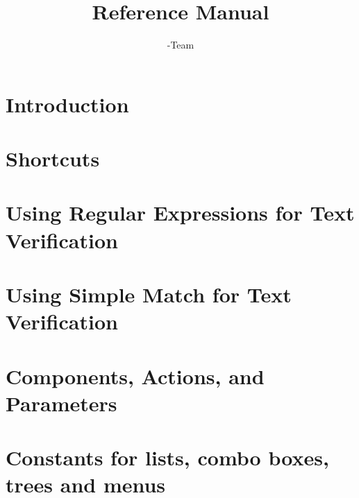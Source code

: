 \documentclass[en,a4paper,twoside,manual,guidancer]{bxreport}
\begin{document}
\title{\GDr{} Reference Manual}
\author*{\GD-Team}{}
\maketitle

\tableofcontents
\renewcommand{\bxcomment}[2]{}%
\clearpage

\chapter{Introduction}

\clearpage

\chapter{Shortcuts}

\clearpage

\chapter{Using Regular Expressions for Text Verification}
\label{regex}

\clearpage

\chapter{Using Simple Match for Text Verification}
\label{simplematch}

\clearpage

\chapter{Components, Actions, and Parameters}
 \label{actparam}
 
 \clearpage

\chapter{Constants for lists, combo boxes, trees and menus}
\label{constants}

\clearpage
\end{document}
